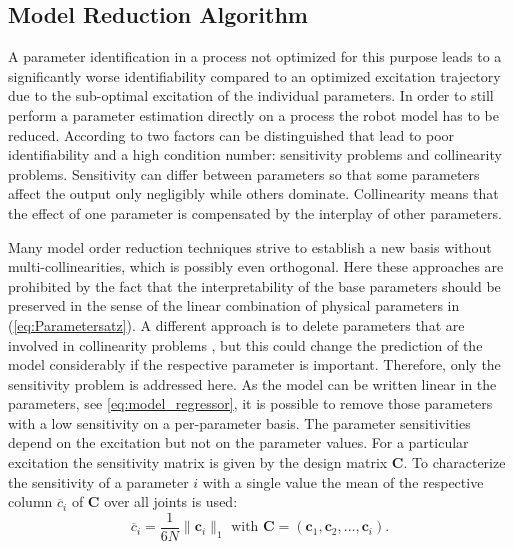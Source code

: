 
\subsection{Model Reduction Algorithm}
A parameter identification in a process not optimized for this purpose leads to a significantly worse identifiability compared to an optimized excitation trajectory due to the sub-optimal excitation of the individual parameters.
In order to still perform a parameter estimation directly on a process the robot model has to be reduced.
According to \cite{Brun2001} two factors can be distinguished that lead to poor identifiability and a high condition number: sensitivity problems and collinearity problems. 
Sensitivity can differ between parameters so that some parameters affect the output only negligibly while others dominate. Collinearity means that the effect of one parameter is compensated by the interplay of other parameters.

Many model order reduction techniques strive to establish a new basis without multi-collinearities, which is possibly even orthogonal. 
Here these approaches are prohibited by the fact that the interpretability of the base parameters should be preserved in the sense of the linear combination of physical parameters in (\ref{eq:Parametersatz}). 
A different approach is to delete parameters that are involved in collinearity problems \cite{Akinniyi2017}, but this could change the prediction of the model considerably if the respective parameter is important. 
Therefore, only the sensitivity problem is addressed here. As the model can be written linear in the parameters, see \eqref{eq:model_regressor}, it is possible to remove those parameters with a low sensitivity on a per-parameter basis. The parameter sensitivities depend on the excitation but not on the parameter values. For a particular excitation the sensitivity matrix is given by the design matrix $\boldsymbol{C}$.
To characterize the sensitivity of a parameter $i$ with a single value the mean of the respective column $\overline{c}_i$ of $\boldsymbol{C}$ over all joints is used:
\begin{equation}\label{eq:mean_Sensitivity}
	\overline{c}_i = \frac{1}{6N} \| \boldsymbol{c}_i \|_1 \text{ with } \boldsymbol{C} = (\boldsymbol{c}_1, \boldsymbol{c}_2, \hdots, \boldsymbol{c}_i).
\end{equation}

